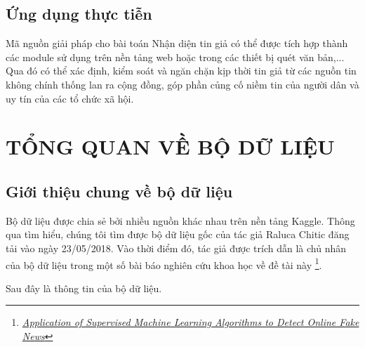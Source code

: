 \documentclass[12pt,a4paper,oneside]{book}
\begin{document}
	\section{Ứng dụng thực tiễn}
	Mã nguồn giải pháp cho bài toán Nhận diện tin giả có thể được tích hợp thành các module sử dụng trên nền tảng web hoặc trong các thiết bị quét văn bản,... Qua đó có thể xác định, kiểm soát và ngăn chặn kịp thời tin giả từ các nguồn tin không chính thống lan ra cộng đồng, góp phần củng cố niềm tin của người dân và uy tín của các tổ chức xã hội.


\chapter{TỔNG QUAN VỀ BỘ DỮ LIỆU}

	

	\section{Giới thiệu chung về bộ dữ liệu}
	
	Bộ dữ liệu được chia sẻ bởi nhiều nguồn khác nhau trên nền tảng Kaggle. Thông qua tìm hiểu, chúng tôi tìm được bộ dữ liệu gốc của tác giả Raluca Chitic đăng tải vào ngày 23/05/2018. Vào thời điểm đó, tác giả được trích dẫn là chủ nhân của bộ dữ liệu trong một số bài báo nghiên cứu khoa học về đề tài này
	\footnote{ \href{https://www.researchgate.net/publication/339299161_Application_of_Supervised_Machine_Learning_Algorithms_to_Detect_Online_Fake_News}{\textit{Application of Supervised Machine Learning Algorithms to Detect Online Fake News}}}.
	
	Sau đây là thông tin của bộ dữ liệu.
	
\end{document}
